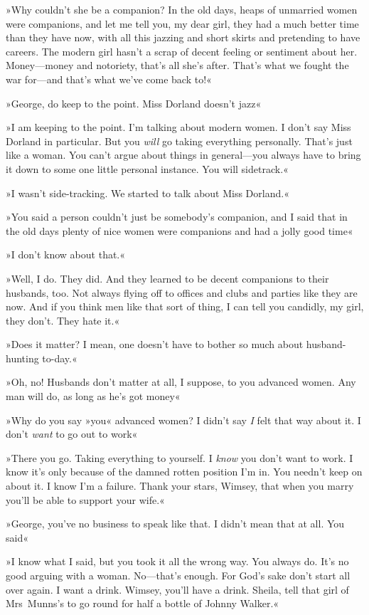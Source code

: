 »Why couldn't she be a companion? In the old days, heaps of unmarried women were companions, and let me tell you, my dear girl, they had a much better time than they have now, with all this jazzing and short skirts and pretending to have careers. The modern girl hasn't a scrap of decent feeling or sentiment about her. Money—money and notoriety, that's all she's after. That's what we fought the war for—and that's what we've come back to!«

»George, do keep to the point. Miss Dorland doesn't jazz\longdash«

»I am keeping to the point. I'm talking about modern women. I don't say Miss Dorland in particular. But you \textit{will} go taking everything personally. That's just like a woman. You can't argue about things in general—you always have to bring it down to some one little personal instance. You will sidetrack.«

»I wasn't side-tracking. We started to talk about Miss Dorland.«

»You said a person couldn't just be somebody's companion, and I said that in the old days plenty of nice women were companions and had a jolly good time\longdash«

»I don't know about that.«

»Well, I do. They did. And they learned to be decent companions to their husbands, too. Not always flying off to offices and clubs and parties like they are now. And if you think men like that sort of thing, I can tell you candidly, my girl, they don't. They hate it.«

»Does it matter? I mean, one doesn't have to bother so much about husband-hunting to-day.«

»Oh, no! Husbands don't matter at all, I suppose, to you advanced women. Any man will do, as long as he's got money\longdash«

»Why do you say »you« advanced women? I didn't say \textit{I} felt that way about it. I don't \textit{want} to go out to work\longdash«

»There you go. Taking everything to yourself. I \textit{know} you don't want to work. I know it's only because of the damned rotten position I'm in. You needn't keep on about it. I know I'm a failure. Thank your stars, Wimsey, that when you marry you'll be able to support your wife.«

»George, you've no business to speak like that. I didn't mean that at all. You said\longdash«

»I know what I said, but you took it all the wrong way. You always do. It's no good arguing with a woman. No—that's enough. For God's sake don't start all over again. I want a drink. Wimsey, you'll have a drink. Sheila, tell that girl of Mrs~Munns's to go round for half a bottle of Johnny Walker.«


